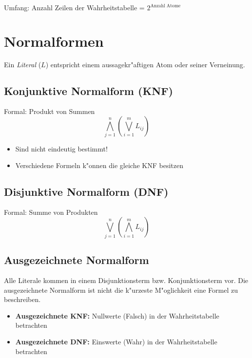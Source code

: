 Umfang: Anzahl Zeilen der Wahrheitstabelle = $2^\text{Anzahl Atome}$

\section{Normalformen}
Ein {\em Literal} ($L$) entspricht einem aussagekr"aftigen Atom oder seiner Verneinung.

\subsection{Konjunktive Normalform (KNF)}
Formal: Produkt von Summen
\begin{equation}
	\bigwedge\limits_{j=1}^n\left({\bigvee\limits_{i=1}^m L_{ij}}\right)
\end{equation}
\begin{itemize}
\item Sind nicht eindeutig bestimmt!
\item Verschiedene Formeln k"onnen die gleiche KNF besitzen
\end{itemize}

\subsection{Disjunktive Normalform (DNF)}
Formal: Summe von Produkten
\begin{equation}
	\bigvee\limits_{j=1}^n\left({\bigwedge\limits_{i=1}^m L_{ij}}\right)
\end{equation}

\subsection{Ausgezeichnete Normalform}
Alle Literale kommen in einem Disjunktionsterm bzw. Konjunktionsterm vor. Die
ausgezeichnete Normalform ist nicht die k"urzeste M"oglichkeit eine Formel zu beschreiben.
\begin{itemize}
\item \textbf{Ausgezeichnete KNF:} Nullwerte (Falsch) in der Wahrheitstabelle betrachten
\item \textbf{Ausgezeichnete DNF:} Einswerte (Wahr) in der Wahrheitstabelle betrachten
\end{itemize}

